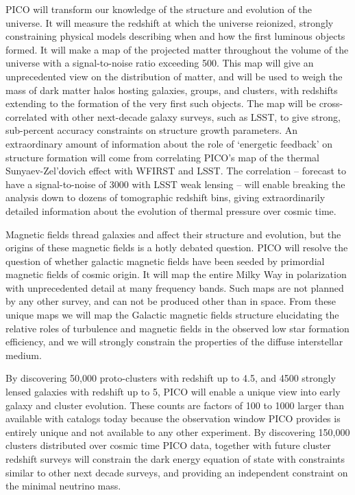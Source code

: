 \documentclass[PICOReport.tex]{subfiles}
\begin{document}
PICO will transform our knowledge of the structure and evolution of the universe. It will measure the redshift at which the universe reionized, strongly constraining physical models describing when and how the first luminous objects formed. It will make a map of the projected matter throughout the volume of the universe with a signal-to-noise ratio exceeding 500. This map will give an unprecedented view on the distribution of matter, and will be used to weigh the mass of dark matter halos hosting galaxies, groups, and clusters, with redshifts extending to the formation of the very first such objects. The map will be cross-correlated with other next-decade galaxy surveys, such as LSST, to give strong, sub-percent accuracy constraints on structure growth parameters.  An extraordinary amount of information about the role of `energetic feedback' on structure formation will come from correlating PICO's map of the thermal Sunyaev-Zel'dovich effect with WFIRST and LSST. The correlation -- forecast to have a signal-to-noise of 3000 with LSST weak lensing -- will enable breaking the analysis down to dozens of tomographic redshift bins, giving extraordinarily detailed information about the evolution of thermal pressure over cosmic time. 

Magnetic fields thread galaxies and affect their structure and evolution, but the origins of these magnetic fields is a hotly debated question. PICO will resolve the question of whether galactic magnetic fields have been seeded by primordial magnetic fields of cosmic origin. It will map the entire Milky Way in polarization with unprecedented detail at many frequency bands. Such maps are not planned by any other survey, and can not be produced other than in space. From these unique maps we will map the Galactic magnetic fields structure elucidating the relative roles of turbulence and magnetic fields in the observed low star formation efficiency, and we will strongly constrain the properties of the diffuse interstellar medium. 

By discovering 50,000 proto-clusters with redshift up to 4.5, and  4500 strongly lensed galaxies with redshift up to 5, PICO will enable a unique view into early galaxy and cluster evolution. These counts are factors of 100 to 1000 larger than available with catalogs today because the observation window PICO provides is entirely unique and not available to any other experiment. By discovering 150,000 clusters distributed over cosmic time PICO data, together with future cluster redshift surveys will constrain the dark energy equation of state with constraints similar to other next decade surveys, and providing an independent constraint on the minimal neutrino mass. 
\end{document}
